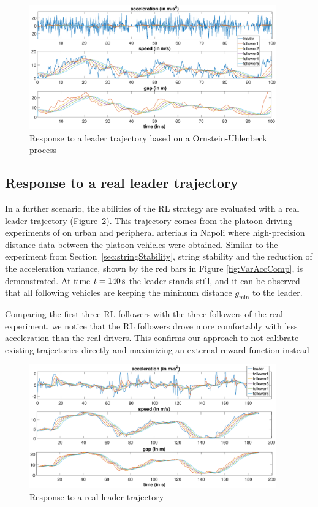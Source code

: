\documentclass[review]{elsarticle}
\providecommand{\sub}[1]{_{\mathrm{#1}}}  %
\providecommand{\3}{{\ss}}
\begin{document}
	
	\begin{figure}
		\centering
		\includegraphics[width=0.95\textwidth]{images/AR1Kolonne}
		\caption{Response to a leader trajectory based on a Ornstein-Uhlenbeck process}
		\label{fig:AR1Kolonne}
	\end{figure}
	
	
	\subsection{Response to a real leader trajectory}
	
	In a further scenario, the abilities of the RL strategy are evaluated
	with a real leader trajectory (Figure~\ref{fig:PunzoKolonne}). This
	trajectory comes from the platoon driving experiments of
	\cite{punzo2005nonstationary} on urban and peripheral arterials in Napoli
	where high-precision distance data between the platoon
	vehicles were obtained. Similar to the experiment from
	Section~\ref{sec:stringStability}, string stability and the reduction
	of  the acceleration variance, shown by the red bars in Figure
	\ref{fig:VarAccComp}, is demonstrated. At time $t = \unit[140]{s}$ the leader
	stands still, and it can be observed that all following vehicles are
	keeping the minimum distance $g\sub{min}$ to the leader.  
	
	Comparing the first three RL followers with the three followers of the real experiment, we notice that the RL followers drove more comfortably with less acceleration than the real drivers. This confirms our approach to not calibrate existing trajectories  directly and maximizing an external reward function instead
	
	
	\begin{figure}
		\centering
		\includegraphics[width=0.95\textwidth]{images/PunzoKolonne}
		\caption{Response to a real leader trajectory}
		\label{fig:PunzoKolonne}
	\end{figure}
	
\end{document}
